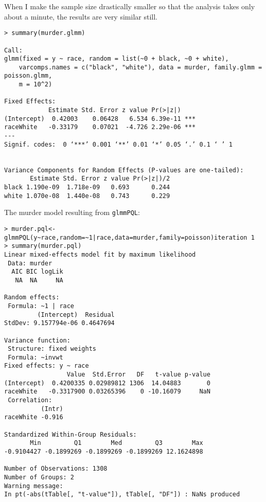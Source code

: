 \documentclass{article}
\begin{document}
When I make the sample size drastically smaller so that the analysis takes only about a minute, the results are very similar still.
\begin{verbatim}
> summary(murder.glmm)

Call:
glmm(fixed = y ~ race, random = list(~0 + black, ~0 + white), 
    varcomps.names = c("black", "white"), data = murder, family.glmm = poisson.glmm, 
    m = 10^2)

Fixed Effects:
            Estimate Std. Error z value Pr(>|z|)    
(Intercept)  0.42003    0.06428   6.534 6.39e-11 ***
raceWhite   -0.33179    0.07021  -4.726 2.29e-06 ***
---
Signif. codes:  0 ‘***’ 0.001 ‘**’ 0.01 ‘*’ 0.05 ‘.’ 0.1 ‘ ’ 1


Variance Components for Random Effects (P-values are one-tailed):
       Estimate Std. Error z value Pr(>|z|)/2
black 1.190e-09  1.718e-09   0.693      0.244
white 1.070e-08  1.440e-08   0.743      0.229

\end{verbatim}

The murder model resulting from \texttt{glmmPQL}:
\begin{verbatim}
> murder.pql<-glmmPQL(y~race,random=~1|race,data=murder,family=poisson)iteration 1
> summary(murder.pql)
Linear mixed-effects model fit by maximum likelihood
 Data: murder 
  AIC BIC logLik
   NA  NA     NA

Random effects:
 Formula: ~1 | race
         (Intercept)  Residual
StdDev: 9.157794e-06 0.4647694

Variance function:
 Structure: fixed weights
 Formula: ~invwt 
Fixed effects: y ~ race 
                 Value  Std.Error   DF   t-value p-value
(Intercept)  0.4200335 0.02989812 1306  14.04883       0
raceWhite   -0.3317900 0.03265396    0 -10.16079     NaN
 Correlation: 
          (Intr)
raceWhite -0.916

Standardized Within-Group Residuals:
       Min         Q1        Med         Q3        Max 
-0.9104427 -0.1899269 -0.1899269 -0.1899269 12.1624898 

Number of Observations: 1308
Number of Groups: 2 
Warning message:
In pt(-abs(tTable[, "t-value"]), tTable[, "DF"]) : NaNs produced

\end{verbatim}
\end{document}
